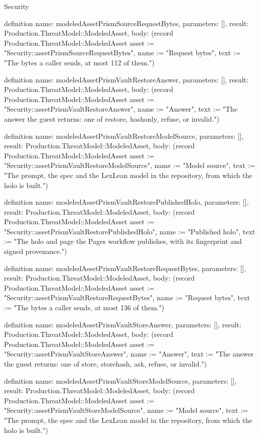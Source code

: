\begin{lexlean}{Security}
\begin{semanticmodule}
definition{
  name: modeledAssetPrismSourceRequestBytes,
  parameters: [],
  result: Production.ThreatModel::ModeledAsset,
  body: (record Production.ThreatModel::ModeledAsset {asset := "Security::assetPrismSourceRequestBytes", name := "Request bytes", text := "The bytes a caller sends, at most 112 of them."})
}

definition{
  name: modeledAssetPrismVaultRestoreAnswer,
  parameters: [],
  result: Production.ThreatModel::ModeledAsset,
  body: (record Production.ThreatModel::ModeledAsset {asset := "Security::assetPrismVaultRestoreAnswer", name := "Answer", text := "The answer the guest returns: one of restore, hashonly, refuse, or invalid."})
}

definition{
  name: modeledAssetPrismVaultRestoreModelSource,
  parameters: [],
  result: Production.ThreatModel::ModeledAsset,
  body: (record Production.ThreatModel::ModeledAsset {asset := "Security::assetPrismVaultRestoreModelSource", name := "Model source", text := "The prompt, the spec and the LexLean model in the repository, from which the holo is built."})
}

definition{
  name: modeledAssetPrismVaultRestorePublishedHolo,
  parameters: [],
  result: Production.ThreatModel::ModeledAsset,
  body: (record Production.ThreatModel::ModeledAsset {asset := "Security::assetPrismVaultRestorePublishedHolo", name := "Published holo", text := "The holo and page the Pages workflow publishes, with its fingerprint and signed provenance."})
}

definition{
  name: modeledAssetPrismVaultRestoreRequestBytes,
  parameters: [],
  result: Production.ThreatModel::ModeledAsset,
  body: (record Production.ThreatModel::ModeledAsset {asset := "Security::assetPrismVaultRestoreRequestBytes", name := "Request bytes", text := "The bytes a caller sends, at most 136 of them."})
}

definition{
  name: modeledAssetPrismVaultStoreAnswer,
  parameters: [],
  result: Production.ThreatModel::ModeledAsset,
  body: (record Production.ThreatModel::ModeledAsset {asset := "Security::assetPrismVaultStoreAnswer", name := "Answer", text := "The answer the guest returns: one of store, storehash, ask, refuse, or invalid."})
}

definition{
  name: modeledAssetPrismVaultStoreModelSource,
  parameters: [],
  result: Production.ThreatModel::ModeledAsset,
  body: (record Production.ThreatModel::ModeledAsset {asset := "Security::assetPrismVaultStoreModelSource", name := "Model source", text := "The prompt, the spec and the LexLean model in the repository, from which the holo is built."})
}


\end{semanticmodule}
\end{lexlean}
